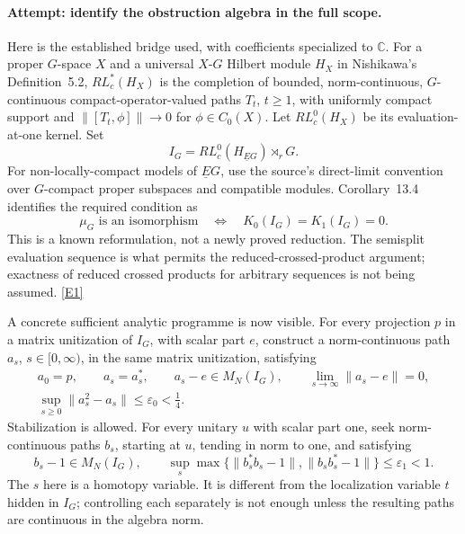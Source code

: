 \documentclass[11pt]{article}
\newcommand{\C}{\mathbb{C}}
\newcommand{\eref}[2]{\hyperlink{extra:#1:#2}{[E#2]}}
\begin{document}
\paragraph{Attempt: identify the obstruction algebra in the full scope.}
Here is the established bridge used, with coefficients specialized to
$\C$. For a proper $G$-space $X$ and a universal $X$-$G$ Hilbert module
$H_X$ in Nishikawa's Definition~5.2, $RL_c^*(H_X)$ is the completion of
bounded, norm-continuous, $G$-continuous compact-operator-valued
paths $T_t$, $t\ge1$,
with uniformly compact support and
$\|[T_t,\phi]\|\to0$ for $\phi\in C_0(X)$.
Let $RL_c^0(H_X)$ be its evaluation-at-one kernel. Set
\begin{equation}\label{ra:statement:kernel}
 I_G=RL_c^0(H_{\underline EG})\rtimes_r G.
\end{equation}
For non-locally-compact models of $\underline EG$, use the source's
direct-limit convention over $G$-compact proper subspaces and compatible
modules. Corollary~13.4 identifies the required condition as
\begin{equation}\label{ra:statement:obstruction}
 \mu_G\text{ is an isomorphism}
 \quad\Longleftrightarrow\quad K_0(I_G)=K_1(I_G)=0.
\end{equation}
This is a known reformulation, not a newly proved reduction. The
semisplit evaluation sequence is what permits the reduced-crossed-product
argument; exactness of reduced crossed products for arbitrary sequences
is not being assumed. \eref{statement}{1}

A concrete sufficient analytic programme is now visible. For every
projection $p$ in a matrix unitization of $I_G$, with scalar part $e$,
construct a norm-continuous path $a_s$, $s\in[0,\infty)$, in the same
matrix unitization, satisfying
\begin{equation}\label{ra:statement:program0}
 \begin{gathered}
 a_0=p,\qquad a_s=a_s^*,\qquad a_s-e\in M_N(I_G),\qquad
 \lim_{s\to\infty}\|a_s-e\|=0,\\
 \sup_{s\ge0}\|a_s^2-a_s\|\le\varepsilon_0<\tfrac14.
 \end{gathered}
\end{equation}
Stabilization is allowed. For every unitary $u$ with scalar part one,
seek norm-continuous paths $b_s$, starting at $u$, tending in norm
to one, and satisfying
\begin{equation}\label{ra:statement:program1}
 b_s-1\in M_N(I_G),\qquad
 \sup_s\max\{\|b_s^*b_s-1\|,\|b_sb_s^*-1\|\}
 \le\varepsilon_1<1.
\end{equation}
The $s$ here is a homotopy variable. It is different from the localization
variable $t$ hidden in $I_G$; controlling each separately is not enough
unless the resulting paths are continuous in the algebra norm.
\end{document}
